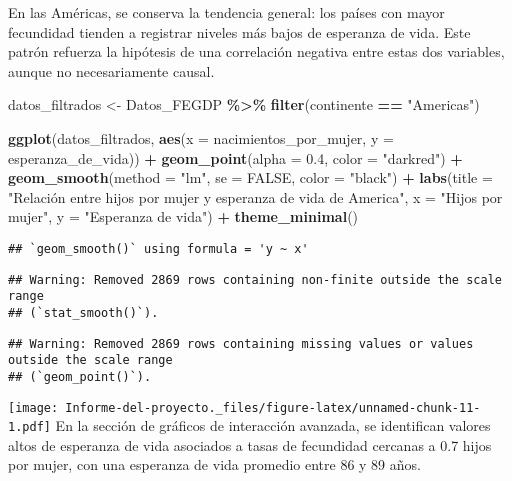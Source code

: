 \documentclass[
]{article}
\newenvironment{Shaded}{\begin{snugshade}}{\end{snugshade}}
\newcommand{\AttributeTok}[1]{\textcolor[rgb]{0.13,0.29,0.53}{#1}}
\newcommand{\ConstantTok}[1]{\textcolor[rgb]{0.56,0.35,0.01}{#1}}
\newcommand{\FloatTok}[1]{\textcolor[rgb]{0.00,0.00,0.81}{#1}}
\newcommand{\FunctionTok}[1]{\textcolor[rgb]{0.13,0.29,0.53}{\textbf{#1}}}
\newcommand{\NormalTok}[1]{#1}
\newcommand{\OtherTok}[1]{\textcolor[rgb]{0.56,0.35,0.01}{#1}}
\newcommand{\SpecialCharTok}[1]{\textcolor[rgb]{0.81,0.36,0.00}{\textbf{#1}}}
\newcommand{\StringTok}[1]{\textcolor[rgb]{0.31,0.60,0.02}{#1}}
\begin{document}
En las Américas, se conserva la tendencia general: los países con mayor
fecundidad tienden a registrar niveles más bajos de esperanza de vida.
Este patrón refuerza la hipótesis de una correlación negativa entre
estas dos variables, aunque no necesariamente causal.

\begin{Shaded}
\begin{Highlighting}[]
\NormalTok{datos\_filtrados }\OtherTok{\textless{}{-}}\NormalTok{ Datos\_FEGDP }\SpecialCharTok{\%\textgreater{}\%}
  \FunctionTok{filter}\NormalTok{(continente }\SpecialCharTok{==} \StringTok{"Americas"}\NormalTok{)}
  
\FunctionTok{ggplot}\NormalTok{(datos\_filtrados, }\FunctionTok{aes}\NormalTok{(}\AttributeTok{x =}\NormalTok{ nacimientos\_por\_mujer, }\AttributeTok{y =}\NormalTok{ esperanza\_de\_vida)) }\SpecialCharTok{+}
  \FunctionTok{geom\_point}\NormalTok{(}\AttributeTok{alpha =} \FloatTok{0.4}\NormalTok{, }\AttributeTok{color =} \StringTok{"darkred"}\NormalTok{) }\SpecialCharTok{+}
  \FunctionTok{geom\_smooth}\NormalTok{(}\AttributeTok{method =} \StringTok{"lm"}\NormalTok{, }\AttributeTok{se =} \ConstantTok{FALSE}\NormalTok{, }\AttributeTok{color =} \StringTok{"black"}\NormalTok{) }\SpecialCharTok{+}
  \FunctionTok{labs}\NormalTok{(}\AttributeTok{title =} \StringTok{"Relación entre hijos por mujer }
\StringTok{       y esperanza de vida de America"}\NormalTok{, }\AttributeTok{x =} \StringTok{"Hijos por mujer"}\NormalTok{, }\AttributeTok{y =} \StringTok{"Esperanza de vida"}\NormalTok{) }\SpecialCharTok{+}
  \FunctionTok{theme\_minimal}\NormalTok{()}
\end{Highlighting}
\end{Shaded}

\begin{verbatim}
## `geom_smooth()` using formula = 'y ~ x'
\end{verbatim}

\begin{verbatim}
## Warning: Removed 2869 rows containing non-finite outside the scale range
## (`stat_smooth()`).
\end{verbatim}

\begin{verbatim}
## Warning: Removed 2869 rows containing missing values or values outside the scale range
## (`geom_point()`).
\end{verbatim}

\texttt{[image: Informe-del-proyecto.\_files/figure-latex/unnamed-chunk-11-1.pdf]}
En la sección de gráficos de interacción avanzada, se identifican
valores altos de esperanza de vida asociados a tasas de fecundidad
cercanas a 0.7 hijos por mujer, con una esperanza de vida promedio entre
86 y 89 años.
\end{document}
